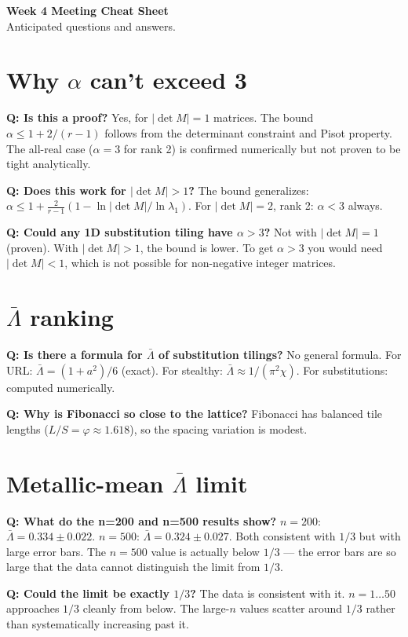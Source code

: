 \documentclass[11pt]{article}
\newcommand{\Q}[1]{\textcolor{qcolor}{\textbf{Q: #1}}}
\begin{document}
{\Large\textbf{Week 4 Meeting Cheat Sheet}}\\[0.3em]
Anticipated questions and answers.

\section{Why $\alpha$ can't exceed 3}

\Q{Is this a proof?}
Yes, for $|\det M|=1$ matrices. The bound $\alpha \leq 1 + 2/(r-1)$
follows from the determinant constraint and Pisot property.
The all-real case ($\alpha = 3$ for rank 2) is confirmed numerically
but not proven to be tight analytically.

\Q{Does this work for $|\det M| > 1$?}
The bound generalizes:
$\alpha \leq 1 + \frac{2}{r-1}(1 - \ln|\det M|/\ln\lambda_1)$.
For $|\det M| = 2$, rank 2: $\alpha < 3$ always.

\Q{Could any 1D substitution tiling have $\alpha > 3$?}
Not with $|\det M| = 1$ (proven). With $|\det M| > 1$, the bound is lower.
To get $\alpha > 3$ you would need $|\det M| < 1$,
which is not possible for non-negative integer matrices.

\section{$\bar\Lambda$ ranking}

\Q{Is there a formula for $\bar\Lambda$ of substitution tilings?}
No general formula. For URL: $\bar\Lambda = (1+a^2)/6$ (exact).
For stealthy: $\bar\Lambda \approx 1/(\pi^2\chi)$.
For substitutions: computed numerically.

\Q{Why is Fibonacci so close to the lattice?}
Fibonacci has balanced tile lengths ($L/S = \varphi \approx 1.618$),
so the spacing variation is modest.

\section{Metallic-mean $\bar\Lambda$ limit}

\Q{What do the n=200 and n=500 results show?}
$n = 200$: $\bar\Lambda = 0.334 \pm 0.022$.
$n = 500$: $\bar\Lambda = 0.324 \pm 0.027$.
Both consistent with $1/3$ but with large error bars.
The $n = 500$ value is actually below $1/3$ --- the error bars
are so large that the data cannot distinguish the limit from $1/3$.

\Q{Could the limit be exactly $1/3$?}
The data is consistent with it. $n = 1\ldots50$ approaches $1/3$
cleanly from below. The large-$n$ values scatter around $1/3$
rather than systematically increasing past it.
\end{document}
